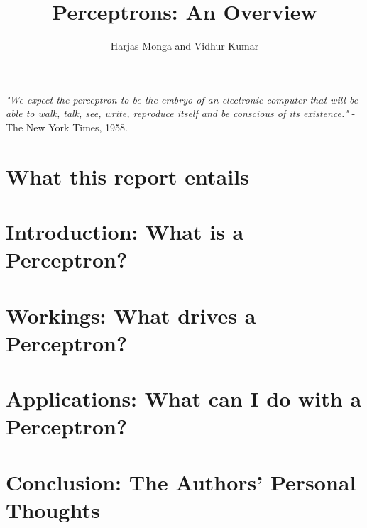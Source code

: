 \documentclass[12pt, titlepage, a4paper]{article}
\title{Perceptrons: An Overview}
\author{Harjas Monga and Vidhur Kumar}
\begin{document}
	\maketitle
	
	\tableofcontents
	
	\newpage

	\textit{"We expect the perceptron to be the embryo of an electronic computer that will be able to walk, talk, see, write, reproduce itself and be conscious of its existence."} - The New York Times, 1958.	
	
	\section{What this report entails}
			
	
	\section{Introduction: What is a Perceptron?}
		
	
	\section{Workings: What drives a Perceptron?}
		
	\section{Applications: What can I do with a Perceptron?}
		
		
	\section{Conclusion: The Authors' Personal Thoughts}
\end{document}
